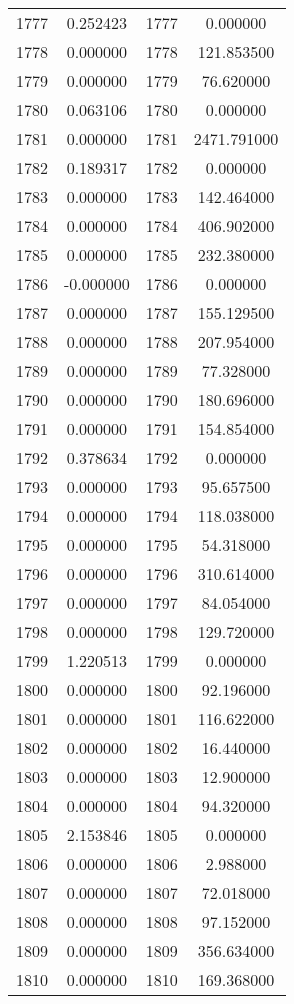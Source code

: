 \documentclass[12pt]{article}
\begin{document}
\begin{longtable}{@{}cccc@{}}
1777 & 0.252423 & 1777 & 0.000000 \\
1778 & 0.000000 & 1778 & 121.853500 \\
1779 & 0.000000 & 1779 & 76.620000 \\
1780 & 0.063106 & 1780 & 0.000000 \\
1781 & 0.000000 & 1781 & 2471.791000 \\
1782 & 0.189317 & 1782 & 0.000000 \\
1783 & 0.000000 & 1783 & 142.464000 \\
1784 & 0.000000 & 1784 & 406.902000 \\
1785 & 0.000000 & 1785 & 232.380000 \\
1786 & -0.000000 & 1786 & 0.000000 \\
1787 & 0.000000 & 1787 & 155.129500 \\
1788 & 0.000000 & 1788 & 207.954000 \\
1789 & 0.000000 & 1789 & 77.328000 \\
1790 & 0.000000 & 1790 & 180.696000 \\
1791 & 0.000000 & 1791 & 154.854000 \\
1792 & 0.378634 & 1792 & 0.000000 \\
1793 & 0.000000 & 1793 & 95.657500 \\
1794 & 0.000000 & 1794 & 118.038000 \\
1795 & 0.000000 & 1795 & 54.318000 \\
1796 & 0.000000 & 1796 & 310.614000 \\
1797 & 0.000000 & 1797 & 84.054000 \\
1798 & 0.000000 & 1798 & 129.720000 \\
1799 & 1.220513 & 1799 & 0.000000 \\
1800 & 0.000000 & 1800 & 92.196000 \\
1801 & 0.000000 & 1801 & 116.622000 \\
1802 & 0.000000 & 1802 & 16.440000 \\
1803 & 0.000000 & 1803 & 12.900000 \\
1804 & 0.000000 & 1804 & 94.320000 \\
1805 & 2.153846 & 1805 & 0.000000 \\
1806 & 0.000000 & 1806 & 2.988000 \\
1807 & 0.000000 & 1807 & 72.018000 \\
1808 & 0.000000 & 1808 & 97.152000 \\
1809 & 0.000000 & 1809 & 356.634000 \\
1810 & 0.000000 & 1810 & 169.368000 \\

\end{longtable}
\end{document}
